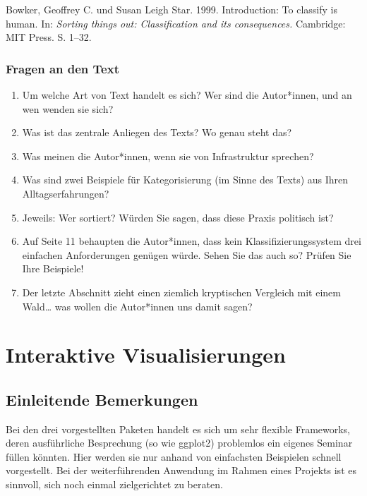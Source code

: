 \documentclass[
  ngerman,
]{article}
\providecommand{\tightlist}{%
  \setlength{\itemsep}{0pt}\setlength{\parskip}{0pt}}
\begin{document}
Bowker, Geoffrey C. und Susan Leigh Star. 1999. Introduction: To classify is human. In: \emph{Sorting things out: Classification and its consequences.} Cambridge: MIT Press. S. 1--32.

\hypertarget{fragen-an-den-text-5}{%
\subsubsection{Fragen an den Text}\label{fragen-an-den-text-5}}

\begin{enumerate}
\def\labelenumi{\arabic{enumi}.}
\tightlist
\item
  Um welche Art von Text handelt es sich? Wer sind die Autor*innen, und an wen wenden sie sich?
\item
  Was ist das zentrale Anliegen des Texts? Wo genau steht das?
\item
  Was meinen die Autor*innen, wenn sie von Infrastruktur sprechen?
\item
  Was sind zwei Beispiele für Kategorisierung (im Sinne des Texts) aus Ihren Alltagserfahrungen?
\item
  Jeweils: Wer sortiert? Würden Sie sagen, dass diese Praxis politisch ist?
\item
  Auf Seite 11 behaupten die Autor*innen, dass kein Klassifizierungssystem drei einfachen Anforderungen genügen würde. Sehen Sie das auch so? Prüfen Sie Ihre Beispiele!
\item
  Der letzte Abschnitt zieht einen ziemlich kryptischen Vergleich mit einem Wald\ldots{} was wollen die Autor*innen uns damit sagen?
\end{enumerate}

\hypertarget{interaktive-visualisierungen}{%
\section{Interaktive Visualisierungen}\label{interaktive-visualisierungen}}

\hypertarget{einleitende-bemerkungen}{%
\subsection{Einleitende Bemerkungen}\label{einleitende-bemerkungen}}

Bei den drei vorgestellten Paketen handelt es sich um sehr flexible Frameworks, deren ausführliche Besprechung (so wie ggplot2) problemlos ein eigenes Seminar füllen könnten.
Hier werden sie nur anhand von einfachsten Beispielen schnell vorgestellt.
Bei der weiterführenden Anwendung im Rahmen eines Projekts ist es sinnvoll, sich noch einmal zielgerichtet zu beraten.
\end{document}
